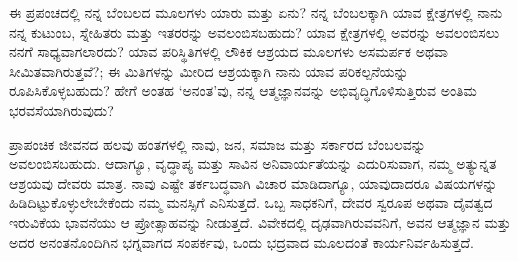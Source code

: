 \newpage
\begin{mananam}{}
\nfntmtxt ಈ ಪ್ರಪಂಚದಲ್ಲಿ ನನ್ನ ಬೆಂಬಲದ ಮೂಲಗಳು ಯಾರು ಮತ್ತು ಏನು? ನನ್ನ ಬೆಂಬಲಕ್ಕಾಗಿ ಯಾವ ಕ್ಷೇತ್ರಗಳಲ್ಲಿ ನಾನು ನನ್ನ ಕುಟುಂಬ, ಸ್ನೇಹಿತರು ಮತ್ತು ಇತರರನ್ನು ಅವಲಂಬಿಸಬಹುದು? ಯಾವ ಕ್ಷೇತ್ರಗಳಲ್ಲಿ  ಅವರನ್ನು ಅವಲಂಬಿಸಲು ನನಗೆ ಸಾಧ್ಯವಾಗಲಾರದು?  ಯಾವ ಪರಿಸ್ಥಿತಿಗಳಲ್ಲಿ ಲೌಕಿಕ ಆಶ್ರಯದ ಮೂಲಗಳು ಅಸಮರ್ಪಕ ಅಥವಾ ಸೀಮಿತವಾಗಿರುತ್ತವೆ?; ಈ ಮಿತಿಗಳನ್ನು ಮೀರಿದ ಆಶ್ರಯಕ್ಕಾಗಿ ನಾನು ಯಾವ ಪರಿಕಲ್ಪನೆಯನ್ನು ರೂಪಿಸಿಕೊಳ್ಳಬಹುದು? ಹೇಗೆ ಅಂತಹ ‘ಅನಂತ’ವು, ನನ್ನ ಆತ್ಮಜ್ಞಾನವನ್ನು ಅಭಿವೃದ್ಧಿಗೊಳಿಸುತ್ತಿರುವ ಅಂತಿಮ ಭರವಸೆಯಾಗಿರುವುದು? 
\end{mananam}
\sReflect
\begin{inspiration}{}
\nfntmtxt ಪ್ರಾಪಂಚಿಕ ಜೀವನದ ಹಲವು ಹಂತಗಳಲ್ಲಿ ನಾವು, ಜನ, ಸಮಾಜ ಮತ್ತು ಸರ್ಕಾರದ ಬೆಂಬಲವನ್ನು ಅವಲಂಬಿಸಬಹುದು. ಆದಾಗ್ಯೂ, ವೃದ್ಧಾಪ್ಯ ಮತ್ತು ಸಾವಿನ ಅನಿವಾರ್ಯತೆಯನ್ನು ಎದುರಿಸುವಾಗ, ನಮ್ಮ ಅತ್ಯುನ್ನತ ಆಶ್ರಯವು ದೇವರು ಮಾತ್ರ. ನಾವು ಎಷ್ಟೇ ತರ್ಕಬದ್ಧವಾಗಿ ವಿಚಾರ ಮಾಡಿದಾಗ್ಯೂ, ಯಾವುದಾದರೂ ವಿಷಯಗಳನ್ನು ಹಿಡಿದಿಟ್ಟುಕೊಳ್ಳುಲೇಬೇಕೆಂದು ನಮ್ಮ ಮನಸ್ಸಿಗೆ ಎನಿಸುತ್ತದೆ.  ಒಬ್ಬ ಸಾಧಕನಿಗೆ, ದೇವರ ಸ್ವರೂಪ ಅಥವಾ ದೈವತ್ವದ ಇರುವಿಕೆಯ ಭಾವನೆಯು ಆ ಪ್ರೋತ್ಸಾಹವನ್ನು  ನೀಡುತ್ತದೆ. ವಿವೇಕದಲ್ಲಿ ದೃಢವಾಗಿರುವವನಿಗೆ, ಅವನ ಆತ್ಮಜ್ಞಾನ ಮತ್ತು ಅದರ ಅನಂತನೊಂದಿಗಿನ ಭಗ್ನವಾಗದ ಸಂಪರ್ಕವು, ಒಂದು ಭದ್ರವಾದ ಮೂಲದಂತೆ ಕಾರ್ಯನಿರ್ವಹಿಸುತ್ತದೆ.
\end{inspiration}
\newpage


